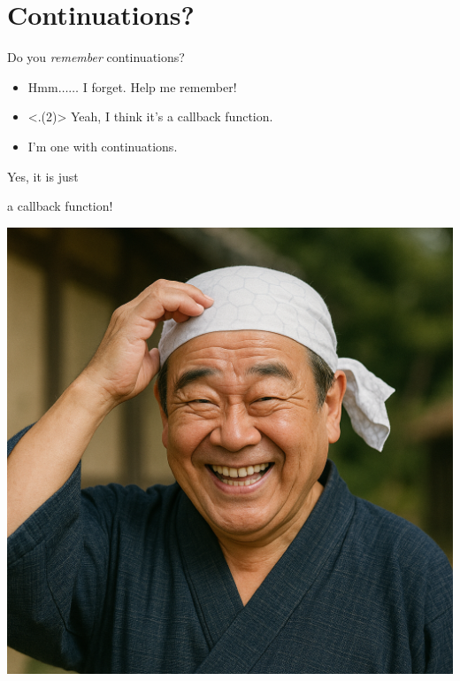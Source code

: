 \section{Continuations?}

\begin{frame}
	\frametitlesec

	Do you \textit{remember} continuations?

	\pause
	\begin{itemize}[<+->]
		\item[\emoji{man-raising-hand}] Hmm$\dots\dots$ I forget. Help me remember!
		\item[\emoji{man-raising-hand}] {\semibf} Yeah, I think it's a callback function.
		\item[\emoji{old-man}] I'm one with continuations.
	\end{itemize}

	\onslide<+->
	\center
	\Large

	\begin{minipage}[c]{.55\linewidth}
		Yes, it is just

		a \textcolor{subhighlight}{callback function}!
	\end{minipage}
	\begin{minipage}[c]{.38\linewidth}
		\includegraphics[height=.5\textheight]{img/ukkari.png}
	\end{minipage}

\end{frame}

